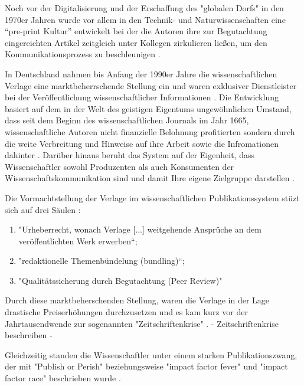 Noch vor der Digitalisierung und der Erschaffung des "globalen Dorfs"\cite{mcluhan_1962_gutenberg} in den 1970er Jahren wurde vor allem in den Technik- und Naturwissenschaften eine “pre-print Kultur” entwickelt bei der die Autoren ihre zur Begutachtung eingereichten Artikel zeitgleich unter Kollegen zirkulieren ließen, um den Kommunikationsprozess zu beschleunigen \cite{suchen-Hoffmann-Zugang-undVerwertung-öffentlicher-Informationen}.

In Deutschland nahmen bis Anfang der 1990er Jahre die wissenschaftlichen Verlage eine marktbeherrschende Stellung ein und waren exklusiver Dienstleister bei der Veröffentlichung wissenschaftlicher Informationen \cite{schloegl_2005} \cite{offhaus_2012_institutionelle_repos}. Die Entwicklung basiert auf dem in der Welt des geistigen Eigentums ungewöhnlichen Umstand, dass seit dem Beginn des wissenschaftlichen Journals im Jahr 1665, wissenschaftliche Autoren nicht finanzielle Belohnung profitierten sondern durch die weite Verbreitung und Hinweise auf ihre Arbeit sowie die Infromationen dahinter \cite{albert_2006_open_implications}. Darüber hinaus beruht das System auf der Eigenheit, dass Wissenschaftler sowohl Produzenten als auch Konsumenten der Wissenschaftskommunikation sind und damit Ihre eigene Zielgruppe darstellen \cite{Hess_2006}.

Die Vormachtstellung der Verlage im wissenschaftlichen Publikationssystem stüzt sich auf drei Säulen \cite{offhaus_2012_institutionelle_repos} \cite{bargheer_2006_open}: 
\begin{enumerate}
\item "Urheberrecht, wonach Verlage [...] weitgehende Ansprüche an dem veröffentlichten Werk erwerben“;
\item "redaktionelle Themenbündelung (bundling)“;
\item "Qualitätssicherung durch Begutachtung (Peer Review)"
\end{enumerate}

Durch diese marktbeherschenden Stellung, waren die Verlage in der Lage drastische Preiserhöhungen durchzusetzen und es kam kurz vor der Jahrtausendwende zur sogenannten "Zeitschriftenkrise" \cite{suchen}. 
- Zeitschriftenkrise beschreiben -

Gleichzeitig standen die Wissenschaftler unter einem starken Publikationszwang, der mit "Publish or Perish" \cite{CLAPHAM_2005} beziehungsweise "impact factor fever" \cite{Cherubini_2008} und "impact factor race" \cite{Brischoux_2009} beschrieben wurde \cite{offhaus_2012_institutionelle_repos}. 

